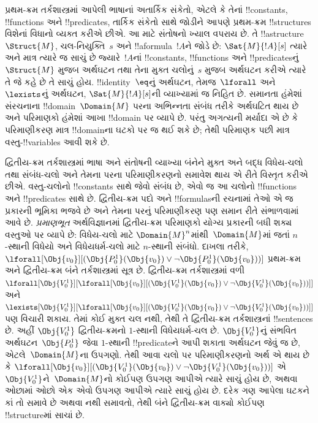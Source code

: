 \documentclass[../../../include/open-logic-section]{subfiles}
\begin{document}


પ્રથમ-ક્રમ તર્કશાસ્ત્રમાં આપેલી ભાષાનાં અતાર્કિક સંકેતો, એટલે કે તેનાં
!!{constant}s, !!{function}s અને !!{predicate}s, તાર્કિક સંકેતો સાથે
જોડીને આપણે પ્રથમ-ક્રમ !!{structure}s વિશેનાં વિધાનો વ્યક્ત કરીએ છીએ.
આ માટે સંતોષનો ખ્યાલ વપરાય છે. તે !!a{structure}~$\Struct{M}$,
ચલ-નિયુક્તિ~$s$ અને !!a{formula}~$!A$ને જોડે છે: $\Sat{M}{!A}[s]$
ત્યારે અને માત્ર ત્યારે જ સાચું છે જ્યારે~$!A$નાં !!{constant}s,
!!{function}s અને !!{predicate}sનું~$\Struct{M}$ મુજબ અર્થઘટન તથા
તેના મુક્ત ચલોનું~$s$ મુજબ અર્થઘટન કરીએ ત્યારે તે જે કહે છે તે
સાચું હોય. !!{identity}~$\eq$નું અર્થઘટન, તેમજ~$\lforall$ અને
$\lexists$નું અર્થઘટન, $\Sat{M}{!A}[s]$ની વ્યાખ્યામાં જ નિહિત છે.
સમાનતા હંમેશાં સંરચનાના !!{domain}~$\Domain{M}$ પરના અભિન્નતા
સંબંધ તરીકે અર્થઘટિત થાય છે અને પરિમાણકો હંમેશાં આખા !!{domain} પર
વ્યાપે છે. પરંતુ અગત્યની મર્યાદા એ છે કે પરિમાણીકરણ માત્ર
!!{domain}ના ઘટકો પર જ થઈ શકે છે; તેથી પરિમાણક પછી માત્ર વસ્તુ-!!{variable}s
આવી શકે છે.

દ્વિતીય-ક્રમ તર્કશાસ્ત્રમાં ભાષા અને સંતોષની વ્યાખ્યા બંનેને મુક્ત અને
બદ્ધ વિધેય-ચલો તથા સંબંધ-ચલો અને તેમના પરના પરિમાણીકરણનો સમાવેશ થાય
એ રીતે વિસ્તૃત કરીએ છીએ. વસ્તુ-ચલોનો !!{constant}s સાથે જેવો સંબંધ છે,
એવો જ આ ચલોનો !!{function}s અને !!{predicate}s સાથે છે. દ્વિતીય-ક્રમ
પદો અને !!{formula}sની રચનામાં તેઓ એ જ પ્રકારની ભૂમિકા ભજવે છે અને
તેમના પરનું પરિમાણીકરણ પણ સમાન રીતે સંભાળવામાં આવે છે. \emph{પ્રમાણભૂત}
અર્થવિજ્ઞાનમાં દ્વિતીય-ક્રમ પરિમાણકો યોગ્ય પ્રકારની બધી શક્ય વસ્તુઓ
પર વ્યાપે છે: વિધેય-ચલો માટે $\Domain{M}^n$માંથી~$\Domain{M}$માં જતાં
$n$-સ્થાની વિધેયો અને વિધેયધર્મ-ચલો માટે $n$-સ્થાની સંબંધો.
દાખલા તરીકે,
$\lforall[\Obj{v_0}][(\Obj{P^1_0}(\Obj{v_0}) \lor \lnot
  \Obj{P^1_0}(\Obj{v_0}))]$ પ્રથમ-ક્રમ અને દ્વિતીય-ક્રમ બંને
તર્કશાસ્ત્રમાં સૂત્ર છે. દ્વિતીય-ક્રમ તર્કશાસ્ત્રમાં વળી
$\lforall[\Obj{V^1_0}][\lforall[\Obj{v_0}][(\Obj{V^1_0}(\Obj{v_0}) \lor
    \lnot \Obj{V^1_0}(\Obj{v_0}))]]$ અને
$\lexists[\Obj{V^1_0}][\lforall[\Obj{v_0}][(\Obj{V^1_0}(\Obj{v_0}) \lor
    \lnot \Obj{V^1_0}(\Obj{v_0}))]]$ પણ વિચારી શકાય. તેમાં કોઈ મુક્ત
ચલ નથી, તેથી તે દ્વિતીય-ક્રમ તર્કશાસ્ત્રનાં !!{sentence}s છે. અહીં
$\Obj{V^1_0}$ દ્વિતીય-ક્રમનો $1$-સ્થાની વિધેયધર્મ-ચલ છે. $\Obj{V^1_0}$નું
સંભવિત અર્થઘટન~$\Obj{P^1_0}$ જેવા $1$-સ્થાની !!{predicate}ને આપી
શકાતા અર્થઘટન જેવું જ છે, એટલે~$\Domain{M}$ના ઉપગણો. તેથી આવા ચલો
પર પરિમાણીકરણનો અર્થ એ થાય છે કે
$\lforall[\Obj{v_0}][(\Obj{V^1_0}(\Obj{v_0}) \lor \lnot
  \Obj{V^1_0}(\Obj{v_0}))]$ એ~$\Obj{V^1_0}$ને~$\Domain{M}$નો કોઈપણ
ઉપગણ આપીએ ત્યારે સાચું હોય છે, અથવા ઓછામાં ઓછો એક એવો ઉપગણ આપીએ
ત્યારે સાચું હોય છે. દરેક ગણ આપેલા ઘટકને કાં તો સમાવે છે અથવા નથી
સમાવતો, તેથી બંને દ્વિતીય-ક્રમ વાક્યો કોઈપણ !!{structure}માં સાચાં છે.
\end{document}
